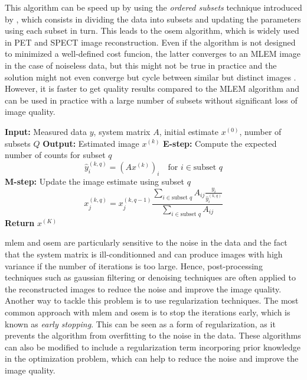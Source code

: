 This algorithm can be speed up by using the \textit{ordered subsets} technique introduced by \cite{Hudson1994}, which consists in dividing the data into subsets and updating the parameters using each subset in turn. This leads to the \acrfull{osem} algorithm, which is widely used in PET and SPECT image reconstruction.
Even if the algorithm is not designed to minimized a well-defined cost funcion, the latter converges to an MLEM image in the case of noiseless data, but this might not be true in practice and the solution might not even converge but cycle between similar but distinct images \cite{6152654}.
However, it is faster to get quality results compared to the MLEM algorithm and can be used in practice with a large number of subsets without significant loss of image quality.
\begin{algorithm}
    \caption{Ordered Subset Expectation Maximization (OSEM)}
    \begin{algorithmic}[1]
    \State \textbf{Input:} Measured data $y$, system matrix $A$, initial estimate $x^{(0)}$, number of subsets $Q$
    \State \textbf{Output:} Estimated image $x^{(k)}$
            \State \textbf{E-step:} Compute the expected number of counts for subset $q$
            \begin{equation*}
                \hat{y}_{i}^{(k,q)} = (Ax^{(k)})_i \quad \text{for } i \in \text{subset } q
            \end{equation*}
            \State \textbf{M-step:} Update the image estimate using subset $q$
            \begin{equation*}
                x_j^{(k,q)} = x_j^{(k,q-1)} \frac{\sum_{i \in \text{subset } q} A_{ij} \frac
                {y_i}{\hat{y}_i^{(k,q)}}}{\sum_{i \in \text{subset } q} A_{ij}}
            \end{equation*}
        \EndFor
    \EndFor
    \State \textbf{Return} $x^{(K)}$
    \end{algorithmic}
    \label{alg:osem}
\end{algorithm}

\acrfull{mlem} and \acrfull{osem} are particularly sensitive to the noise in the data and the fact that the system matrix is ill-conditionned and can produce images with high variance if the number of iterations is too large.
Hence, post-processing techniques such as gaussian filtering or denoising techniques are often applied to the reconstructed images to reduce the noise and improve the image quality.
Another way to tackle this problem is to use regularization techniques. The most common approach with \acrshort{mlem} and \acrshort{osem} is to stop the iterations early, which is known as \textit{early stopping}. This can be seen as a form of regularization, as it prevents the algorithm from overfitting to the noise in the data. %
These algorithms can also be modified to include a regularization term incorporing prior knowledge in the optimization problem, which can help to reduce the noise and improve the image quality.

